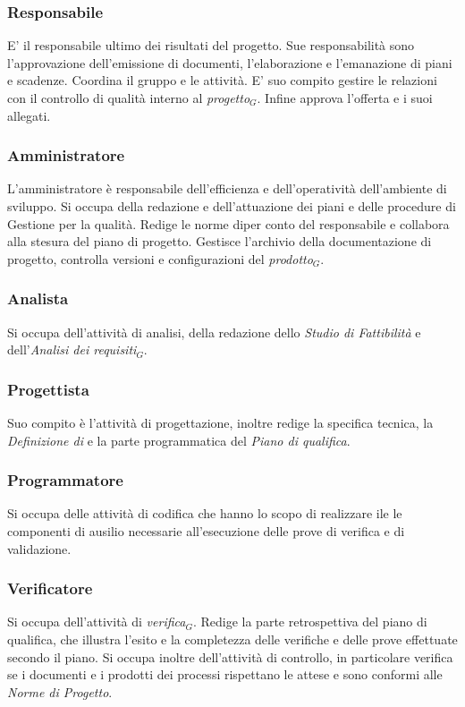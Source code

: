 \subsubsection{Responsabile}E' il responsabile ultimo dei risultati del progetto. Sue responsabilità sono l'approvazione dell'emissione di documenti, l'elaborazione e l'emanazione di piani e scadenze. Coordina il gruppo e le attività. E' suo compito gestire le relazioni con il controllo di qualità interno al \textit{progetto$_{G}$}. Infine approva l'offerta e i suoi allegati.
\subsubsection{Amministratore} L'amministratore è responsabile dell'efficienza e dell'operatività dell'ambiente di sviluppo. Si occupa della redazione e dell'attuazione dei piani e delle procedure di Gestione per la qualità. Redige le norme diper conto del responsabile e collabora alla stesura del piano di progetto. Gestisce l'archivio della documentazione di progetto, controlla versioni e configurazioni del \textit{prodotto$_{G}$}.
\subsubsection{Analista} Si occupa dell'attività di analisi, della redazione dello \textit{Studio di Fattibilità} e dell'\textit{Analisi dei requisiti$_{G}$}.
\subsubsection{Progettista} Suo compito è l'attività di progettazione, inoltre redige la specifica tecnica, la \textit{Definizione di} e la parte programmatica del \textit{Piano di qualifica}. 
\subsubsection{Programmatore} Si occupa delle attività di codifica che hanno lo scopo di realizzare ile le componenti di ausilio necessarie all'esecuzione delle prove di verifica e di validazione.
\subsubsection{Verificatore} Si occupa dell'attività di \textit{verifica$_{G}$}. Redige la parte retrospettiva del piano di qualifica, che illustra l'esito e la completezza delle verifiche e delle prove effettuate secondo il piano. Si occupa  inoltre dell'attività di controllo, in particolare verifica se i documenti e i prodotti dei processi rispettano le attese e sono conformi alle \textit{Norme di Progetto}. 


